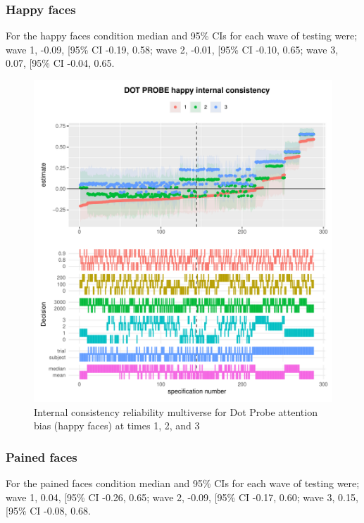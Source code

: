 \documentclass[
  man,floatsintext]{apa6}
\begin{document}
\newpage

\hypertarget{happy-faces}{%
\subsubsection{Happy faces}\label{happy-faces}}

For the happy faces condition median and 95\% CIs for each wave of testing were; wave 1, -0.09, {[}95\% CI -0.19, 0.58; wave 2, -0.01, {[}95\% CI -0.10, 0.65; wave 3, 0.07, {[}95\% CI -0.04, 0.65.

\begin{figure}
\centering
\includegraphics{Reliability_Multiverse_files/figure-latex/unnamed-chunk-14-1.pdf}
\caption{\label{fig:unnamed-chunk-14}Internal consistency reliability multiverse for Dot Probe attention bias (happy faces) at times 1, 2, and 3}
\end{figure}

\newpage

\hypertarget{pained-faces}{%
\subsubsection{Pained faces}\label{pained-faces}}

For the pained faces condition median and 95\% CIs for each wave of testing were; wave 1, 0.04, {[}95\% CI -0.26, 0.65; wave 2, -0.09, {[}95\% CI -0.17, 0.60; wave 3, 0.15, {[}95\% CI -0.08, 0.68.
\end{document}
